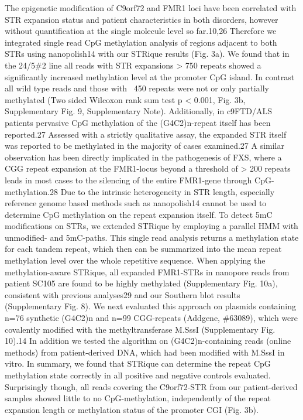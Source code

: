The epigenetic modification of C9orf72 and FMR1 loci have been correlated with STR expansion status and patient characteristics in both disorders, however without quantification at the single molecule level so far.10,26 Therefore we integrated single read CpG methylation analysis of regions adjacent to both STRs using nanopolish14 with our STRique results (Fig. 3a). We found that in the 24/5\#2 line all reads with STR expansions > 750 repeats showed a significantly increased methylation level at the promoter CpG island. In contrast all wild type reads and those with ~450 repeats were not or only partially methylated (Two sided Wilcoxon rank sum test p < 0.001, Fig. 3b, Supplementary Fig. 9, Supplementary Note).
Additionally, in c9FTD/ALS patients pervasive CpG methylation of the (G4C2)n-repeat itself has been reported.27 Assessed with a strictly qualitative assay, the expanded STR itself was reported to be methylated in the majority of cases examined.27 A similar observation has been directly implicated in the pathogenesis of FXS, where a CGG repeat expansion at the FMR1-locus beyond a threshold of > 200 repeats leads in most cases to the silencing of the entire FMR1-gene through CpG-methylation.28
Due to the intrinsic heterogeneity in STR length, especially reference genome based methods such as nanopolish14 cannot be used to determine CpG methylation on the repeat expansion itself. To detect 5mC modifications on STRs, we extended STRique by employing a parallel HMM with unmodified- and 5mC-paths. This single read analysis returns a methylation state for each tandem repeat, which then can be summarized into the mean repeat methylation level over the whole repetitive sequence.
When applying the methylation-aware STRique, all expanded FMR1-STRs in nanopore reads from patient SC105 are found to be highly methylated (Supplementary Fig. 10a), consistent with previous analyses29 and our Southern blot results (Supplementary Fig. 8). We next evaluated this approach on plasmids containing n=76 synthetic (G4C2)n and n=99 CGG-repeats (Addgene, \#63089), which were covalently modified with the methyltransferase M.SssI (Supplementary Fig. 10).14 In addition we tested the algorithm on (G4C2)n-containing reads (online methods) from patient-derived DNA, which had been modified with M.SssI in vitro. In summary, we found that STRique can determine the repeat CpG methylation state correctly in all positive and negative controls evaluated.
Surprisingly though, all reads covering the C9orf72-STR from our patient-derived samples showed little to no CpG-methylation, independently of the repeat expansion length or methylation status of the promoter CGI (Fig. 3b).


